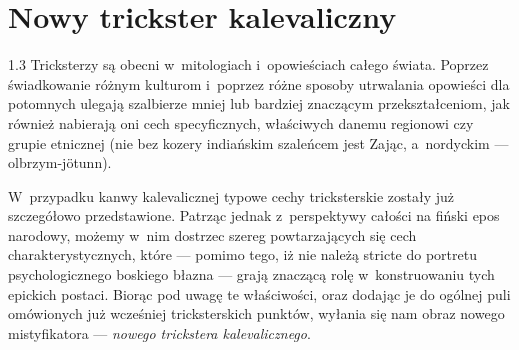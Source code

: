 \documentclass[11pt,a4paper,twoside]{report}
\begin{document}
\chapter{Nowy trickster kalevaliczny}
\begin{spacing}{1.3}
Tricksterzy są obecni w~mitologiach i~opowieściach całego świata. Poprzez świadkowanie różnym kulturom i~poprzez różne sposoby utrwalania opowieści dla potomnych ulegają szalbierze mniej lub bardziej znaczącym przekształceniom, jak również nabierają oni cech specyficznych, właściwych danemu regionowi czy grupie etnicznej (nie bez kozery indiańskim szaleńcem jest Zając, a~nordyckim --- olbrzym-jötunn).

W~przypadku kanwy kalevalicznej typowe cechy tricksterskie zostały już szczegółowo przedstawione. Patrząc jednak z~perspektywy całości na fiński epos narodowy, możemy w~nim dostrzec szereg powtarzających się cech charakterystycznych, które --- pomimo tego, iż nie należą stricte do portretu psychologicznego boskiego błazna --- grają znaczącą rolę w~konstruowaniu tych epickich postaci. Biorąc pod uwagę te właściwości, oraz dodając je do ogólnej puli omówionych już wcześniej tricksterskich punktów, wyłania się nam obraz nowego mistyfikatora --- \emph{nowego trickstera kalevalicznego}.
\end{spacing}
\end{document}
